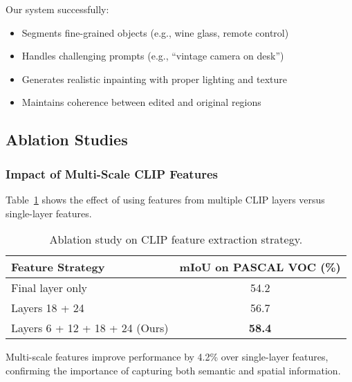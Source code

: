 Our system successfully:
\begin{itemize}
    \item Segments fine-grained objects (e.g., wine glass, remote control)
    \item Handles challenging prompts (e.g., ``vintage camera on desk'')
    \item Generates realistic inpainting with proper lighting and texture
    \item Maintains coherence between edited and original regions
\end{itemize}

\subsection{Ablation Studies}

\subsubsection{Impact of Multi-Scale CLIP Features}

Table~\ref{tab:ablation_clip} shows the effect of using features from multiple CLIP layers versus single-layer features.

\begin{table}[h]
\centering
\caption{Ablation study on CLIP feature extraction strategy.}
\label{tab:ablation_clip}
\begin{tabular}{lc}
\hline
\textbf{Feature Strategy} & \textbf{mIoU on PASCAL VOC (\%)} \\
\hline
Final layer only & 54.2 \\
Layers 18 + 24 & 56.7 \\
Layers 6 + 12 + 18 + 24 (Ours) & \textbf{58.4} \\
\hline
\end{tabular}
\end{table}

Multi-scale features improve performance by 4.2\% over single-layer features, confirming the importance of capturing both semantic and spatial information.

